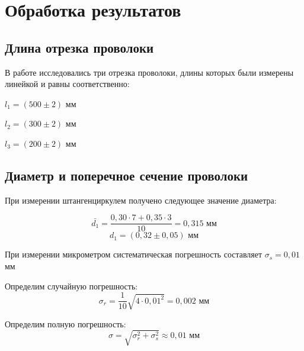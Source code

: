 \documentclass{report}
\begin{document}
	\begin{table}[!h]
		\centering
	\end{table}
	
	\section*{Обработка результатов}
	\subsection*{Длина отрезка проволоки}
	
	В работе исследовались три отрезка проволоки, длины которых были измерены линейкой и равны соответственно:
	
	\begin{center}
		$l_{1} = (500 \pm 2)$ мм
		
		$l_{2} = (300 \pm 2)$ мм
		
		$l_{3} = (200 \pm 2)$ мм
	\end{center}
	
	
	\subsection*{Диаметр и поперечное сечение проволоки}
	
	При измерении штангенциркулем получено следующее значение диаметра:
	
	\begin{equation}
		\bar{d_{1}}= \frac{0,30 \cdot 7 + 0,35 \cdot 3 }{10} = 0,315  \text{ мм} 
	\end{equation}
	\begin{equation}
		d_{1} = (0,32 \pm 0,05)  \text{ мм}
	\end{equation}
	
	При измерении микрометром систематическая погрешность составляет $\sigma_{s} = 0,01$ мм
	
	Определим случайную погрешность:
	\begin{equation}
		\sigma_{r} = \frac{1}{10} \sqrt{4 \cdot 0,01^{2}} = 0,002 \text{ мм}
	\end{equation}
	
	Определим полную погрешность:
	\begin{equation}
		\sigma = \sqrt{\sigma_{r}^{2} + \sigma_{s}^{2}} \approx 0,01 \text{ мм}
	\end{equation}
	
\end{document}
